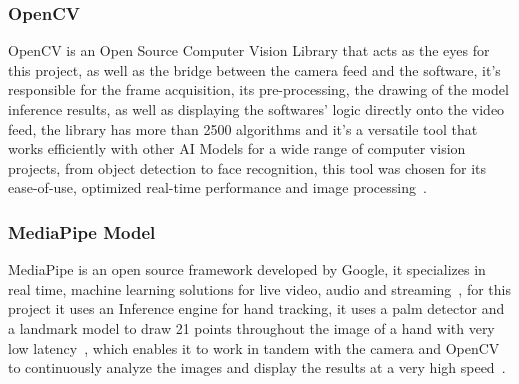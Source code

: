 \subsubsection{OpenCV}
OpenCV is an Open Source Computer Vision Library that acts as the eyes for this project, as well as the bridge between the camera feed and the software, it's responsible for the frame acquisition, its pre-processing, the drawing of the model inference results, as well as displaying the softwares' logic directly onto the video feed, the library has more than 2500 algorithms and it's a versatile tool that works efficiently with other AI Models for a wide range of computer vision projects, from object detection to face recognition, this tool was chosen for its ease-of-use, optimized real-time performance and image processing~\cite{opencv_about}.
	
\subsubsection{MediaPipe Model}
MediaPipe is an open source framework developed by Google, it specializes in real time, machine learning solutions for live video, audio and streaming~\cite{mediapipe_main}, for this project it uses an Inference engine for hand tracking, it uses a palm detector and a landmark model to draw 21 points throughout the image of a hand with very low latency~\cite{mediapipe_hands}, which enables it to work in tandem with the camera and OpenCV to continuously analyze the images and display the results at a very high speed~\cite{deep2025intellimotion}.